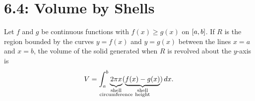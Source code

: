 \documentclass[../mathNotesPreamble]{subfiles}
\begin{document}
  \section*{6.4: Volume by Shells}

  \begin{thmBox*}
    Let $f$ and $g$ be continuous functions with $f(x)\geq g(x)$ on ${\left[a,b\right]}$. If $R$ is the region bounded by the curves $y=f(x)$ and $y=g(x)$ between the lines $x=a$ and $x=b$, the volume of the solid generated when $R$ is revolved about the $y$-axis is
      \[V=\int_a^b \underbrace{2\pi x\vphantom{)}}_{\substack{\textnormal{shell}\\\mathclap{\textnormal{circumference}}}} (\underbrace{f(x)-g(x)}_{\substack{\textnormal{shell}\\\textnormal{height}}})\,dx.\]
  \end{thmBox*}


  
\end{document}
